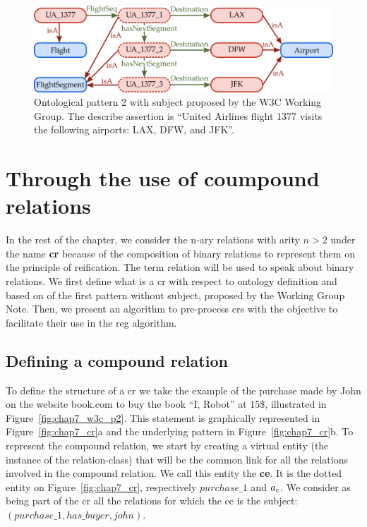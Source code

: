 \begin{figure}[ht!]
\centering
\includegraphics[scale=0.4]{figures/chapter7/w3c_p3.png}
\caption{\label{fig:chap7_w3c_p3} Ontological pattern 2 with subject proposed by the W3C Working Group. The describe assertion is ``United Airlines flight 1377 visits the following airports: LAX, DFW, and JFK''.}
\end{figure}

\section{Through the use of coumpound relations}

In the rest of the chapter, we consider the n-ary relations with arity $n > 2$ under the name \textbf{\acrfull{cr}} because of the composition of binary relations to represent them on the principle of reification. The term relation will be used to speak about binary relations. We first define what is a \acrshort{cr} with respect to ontology definition and based on of the first pattern without subject, proposed by the Working Group Note. Then, we present an algorithm to pre-process \acrfull{cr}s with the objective to facilitate their use in the \acrshort{reg} algorithm.

\subsection{Defining a compound relation}

To define the structure of a \acrlong{cr} we take the example of the purchase made by John on the website book.com to buy the book ``I, Robot'' at 15\$, illustrated in Figure~\ref{fig:chap7_w3c_p2}. This statement is graphically represented in Figure~\ref{fig:chap7_cr}a and the underlying pattern in Figure~\ref{fig:chap7_cr}b. To represent the compound relation, we start by creating a virtual entity (the instance of the relation-class) that will be the common link for all the relations involved in the compound relation. We call this entity the \textbf{\acrfull{ce}}. It is the dotted entity on Figure~\ref{fig:chap7_cr}, respectively $purchase\_1$ and $a_c$. We consider as being part of the \acrshort{cr} all the relations for which the \acrshort{ce} is the subject: $(purchase\_1, has\_buyer, john)$. 

